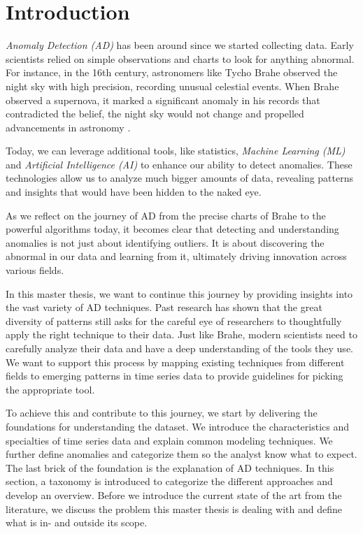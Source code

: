 \chapter{Introduction}
\label{ch:introduction}


\textit{Anomaly Detection (AD)} has been around since we started collecting data. Early scientists relied on simple observations and charts to look for anything abnormal. For instance, in the 16th century, astronomers like Tycho Brahe observed the night sky with high precision, recording unusual celestial events. When Brahe observed a supernova, it marked a significant anomaly in his records that contradicted the belief, the night sky would not change and propelled advancements in astronomy \cite{Decourchelle2017}.

Today, we can leverage additional tools, like statistics, \textit{Machine Learning (ML)} and \textit{Artificial Intelligence (AI)} to enhance our ability to detect anomalies. These technologies allow us to analyze much bigger amounts of data, revealing patterns and insights that would have been hidden to the naked eye.

As we reflect on the journey of AD from the precise charts of Brahe to the powerful algorithms today, it becomes clear that detecting and understanding anomalies is not just about identifying outliers. It is about discovering the abnormal in our data and learning from it, ultimately driving innovation across various fields.

In this master thesis, we want to continue this journey by providing insights into the vast variety of AD techniques. Past research has shown that the great diversity of patterns still asks for the careful eye of researchers to thoughtfully apply the right technique to their data. Just like Brahe, modern scientists need to carefully analyze their data and have a deep understanding of the tools they use. We want to support this process by mapping existing techniques from different fields to emerging patterns in time series data to provide guidelines for picking the appropriate tool.

To achieve this and contribute to this journey, we start by delivering the foundations for understanding the dataset. We introduce the characteristics and specialties of time series data and explain common modeling techniques. We further define anomalies and categorize them so the analyst know what to expect. The last brick of the foundation is the explanation of AD techniques. In this section, a taxonomy is introduced to categorize the different approaches and develop an overview. Before we introduce the current state of the art from the literature, we discuss the problem this master thesis is dealing with and define what is in- and outside its scope. 

